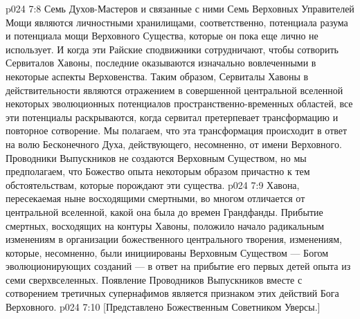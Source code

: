 \vs p024 7:8 \pc Семь Духов\hyp{}Мастеров и связанные с ними Семь Верховных Управителей Мощи являются личностными хранилищами, соответственно, потенциала разума и потенциала мощи Верховного Существа, которые он пока еще лично не использует. И когда эти Райские сподвижники сотрудничают, чтобы сотворить Сервиталов Хавоны, последние оказываются изначально вовлеченными в некоторые аспекты Верховенства. Таким образом, Сервиталы Хавоны в действительности являются отражением в совершенной центральной вселенной некоторых эволюционных потенциалов пространственно\hyp{}временных областей, все эти потенциалы раскрываются, когда сервитал претерпевает трансформацию и повторное сотворение. Мы полагаем, что эта трансформация происходит в ответ на волю Бесконечного Духа, действующего, несомненно, от имени Верховного. Проводники Выпускников не создаются Верховным Существом, но мы предполагаем, что Божество опыта некоторым образом причастно к тем обстоятельствам, которые порождают эти существа.
\vs p024 7:9 Хавона, пересекаемая ныне восходящими смертными, во многом отличается от центральной вселенной, какой она была до времен Грандфанды. Прибытие смертных, восходящих на контуры Хавоны, положило начало радикальным изменениям в организации божественного центрального творения, изменениям, которые, несомненно, были инициированы Верховным Существом --- Богом эволюционирующих созданий --- в ответ на прибытие его первых детей опыта из семи сверхвселенных. Появление Проводников Выпускников вместе с сотворением третичных супернафимов является признаком этих действий Бога Верховного.
\vsetoff
\vs p024 7:10 [Представлено Божественным Советником Уверсы.]
